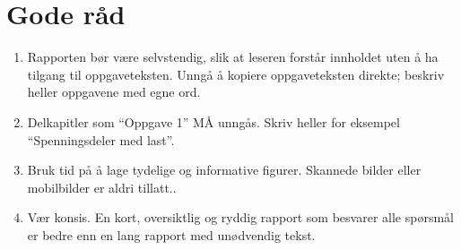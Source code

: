\documentclass[11pt,a4paper,twocolumn]{article}
\begin{document}
\section{Gode råd}\label{app:god}
\begin{enumerate}[I]
    \item Rapporten bør være selvstendig, slik at leseren forstår innholdet uten å ha tilgang til oppgaveteksten. Unngå å kopiere oppgaveteksten direkte; beskriv heller oppgavene med egne ord.
    \item Delkapitler som ``Oppgave 1'' MÅ unngås. Skriv heller for eksempel ``Spenningsdeler med last''.
    \item Bruk tid på å lage tydelige og informative figurer. Skannede bilder eller mobilbilder er aldri tillatt..
    \item Vær konsis. En kort, oversiktlig og ryddig rapport som besvarer alle spørsmål er bedre enn en lang rapport med unødvendig tekst.
\end{enumerate}
\end{document}

